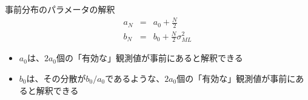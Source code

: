 \begin{frame}{事前分布のパラメータの解釈}
 \begin{eqnarray*}
  a_N&=& a_0 + \frac{N}{2}\label{115004_19Nov14}\\
  b_N%
  &= & b_0+\frac{N}{2}\sigma^2_{ML}\label{115046_19Nov14}
 \end{eqnarray*}
 \begin{itemize}
  \item $a_0$は、$2a_0$個の「有効な」観測値が事前にあると解釈できる
  \item $b_0$は、その分散が$b_0/a_0$であるような、$2a_0$個の「有効な」観測値が事前にあると解釈できる
 \end{itemize}
\end{frame}



